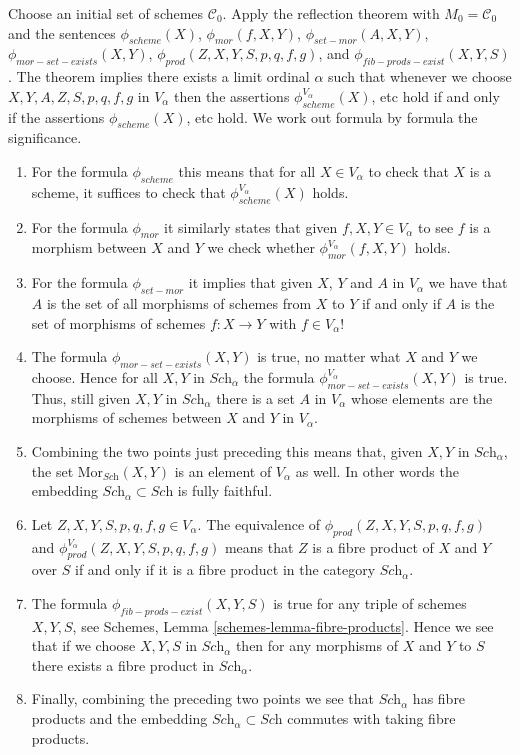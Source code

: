 \medskip\noindent
Choose an initial set of schemes $\mathcal{C}_0$.
Apply the reflection theorem with $M_0 = \mathcal{C}_0$
and the sentences
$\phi_{scheme}(X)$,
$\phi_{mor}(f, X, Y)$,
$\phi_{set-mor}(A, X, Y)$,
$\phi_{mor-set-exists}(X, Y)$,
$\phi_{prod}(Z, X, Y, S, p, q, f, g)$,
and
$\phi_{fib-prods-exist}(X, Y, S)$. The theorem implies
there exists a limit ordinal $\alpha$ such that
whenever we choose $X, Y, A, Z, S, p, q, f, g$ in
$V_\alpha$ then the assertions $\phi_{scheme}^{V_\alpha}(X)$, etc
hold if and only if the assertions $\phi_{scheme}(X)$, etc hold.
We work out formula by formula the significance.
\begin{enumerate}
\item For the formula $\phi_{scheme}$ this means that for
all $X \in V_\alpha$ to check that $X$ is a scheme,
it suffices to check that $\phi_{scheme}^{V_\alpha}(X)$ holds.
\item For the formula $\phi_{mor}$ it similarly states that
given $f, X, Y \in V_\alpha$ to see $f$ is a morphism
between $X$ and $Y$ we check whether
$\phi_{mor}^{V_\alpha}(f, X, Y)$ holds.
\item For the formula $\phi_{set-mor}$ it implies that given $X$, $Y$ and
$A$ in $V_\alpha$ we have that $A$ is the set of all morphisms of schemes
from $X$ to $Y$ if and only if $A$ is the set of morphisms of schemes
$f : X \to Y$ with $f \in V_\alpha$!
\item The formula $\phi_{mor-set-exists}(X, Y)$ is true, no matter
what $X$ and $Y$ we choose.
Hence for all $X, Y$ in $\textit{Sch}_\alpha$ the
formula $\phi_{mor-set-exists}^{V_\alpha}(X, Y)$ is true.
Thus, still given $X, Y$ in $\textit{Sch}_\alpha$
there is a set $A$ in $V_\alpha$ whose elements are the morphisms
of schemes between $X$ and $Y$ in $V_\alpha$.
\item Combining the two points just preceding
this means that, given $X, Y$ in $\textit{Sch}_\alpha$, the set
$\text{Mor}_{\textit{Sch}}(X, Y)$ is an element of $V_\alpha$
as well. In other words the embedding
$\textit{Sch}_\alpha \subset \textit{Sch}$ is fully faithful.
\item Let $Z, X, Y, S, p, q, f, g \in V_\alpha$.
The equivalence of $\phi_{prod}(Z, X, Y, S, p, q, f, g)$
and $\phi_{prod}^{V_\alpha}(Z, X, Y, S, p, q, f, g)$ means that
$Z$ is a fibre product of $X$ and $Y$ over $S$ if and only if
it is a fibre product in the category $\textit{Sch}_\alpha$.
\item The formula $\phi_{fib-prods-exist}(X, Y, S)$ is true
for any triple of schemes $X, Y, S$, see Schemes,
Lemma \ref{schemes-lemma-fibre-products}. Hence we see that if
we choose $X, Y, S$ in $\textit{Sch}_\alpha$ then for any
morphisms of $X$ and $Y$ to $S$ there exists a fibre product
in $\textit{Sch}_\alpha$.
\item Finally, combining the preceding two points we see that
$\textit{Sch}_\alpha$ has fibre products and the embedding
$\textit{Sch}_\alpha \subset \textit{Sch}$ commutes with
taking fibre products.
\end{enumerate}
